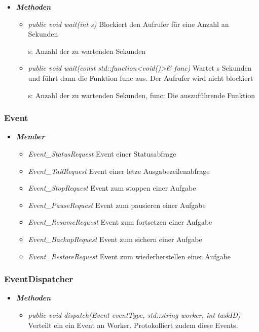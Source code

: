 \documentclass[a4paper,12pt]{article}
\begin{document}
\begin{itemize}[label={}]

	\item\textit{\textbf{Methoden}}
		\begin{itemize}[label={\textbullet}]
			\item\textit{public void wait(int s)} Blockiert den Aufrufer für eine Anzahl an Sekunden

s: Anzahl der zu wartenden Sekunden
			\item\textit{public void wait(const std::function<void()>\& func)} Wartet s Sekunden und führt dann die Funktion func aus.
Der Aufrufer wird nicht blockiert

s: Anzahl der zu wartenden Sekunden,
func: Die auszuführende Funktion
			
		\end{itemize}
\end{itemize}

\subsubsection{Event}

\begin{itemize}[label={}]
	\item\textit{\textbf{Member}}
		\begin{itemize}[label={\textbullet}]
			\item\textit{Event\_StatusRequest} Event einer Statusabfrage
			\item\textit{Event\_TailRequest} Event einer letze Ausgabezeilenabfrage
			\item\textit{Event\_StopRequest} Event zum stoppen einer Aufgabe
			\item\textit{Event\_PauseRequest} Event zum pausieren einer Aufgabe
			\item\textit{Event\_ResumeRequest} Event zum fortsetzen einer Aufgabe
			\item\textit{Event\_BackupRequest} Event zum sichern einer Aufgabe
			\item\textit{Event\_RestoreRequest} Event zum wiederherstellen einer Aufgabe
		\end{itemize}
\end{itemize}

\subsubsection{EventDispatcher}

\begin{itemize}[label={}]

	\item\textit{\textbf{Methoden}}
		\begin{itemize}[label={\textbullet}]
			\item\textit{public void dispatch(Event eventType, std::string worker, int taskID)} Verteilt ein ein Event an Worker. Protokolliert zudem diese Events.
			
		\end{itemize}
\end{itemize}
\end{document}
